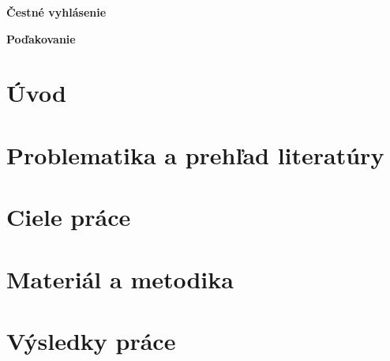 \documentclass[12pt,a4paper]{article}
\begin{document}
\setcounter{page}{2}

\null
\vfill
\thispagestyle{empty}

\noindent
\textbf{Čestné vyhlásenie} %



\vspace{6cm}
\newpage

\null
\vfill

\noindent
\textbf{Poďakovanie} %



\vspace{6cm}

\tableofcontents



\section*{Úvod}


\section{Problematika a prehľad literatúry}


\section{Ciele práce}


\section{Materiál a metodika}


\section{Výsledky práce}

\end{document}
